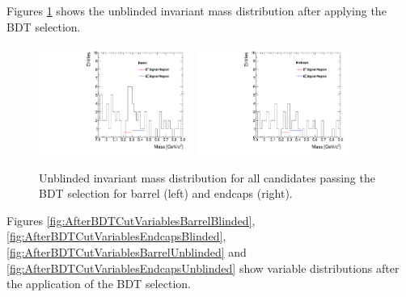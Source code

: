 Figures \ref{fig:massPlotUnblinded} shows the unblinded invariant mass distribution after applying the BDT selection.

\begin{figure}
  \centering
  \includegraphics[width=0.45\textwidth]{Figures/BarrelMassPlotUnblinded.pdf}
  \includegraphics[width=0.45\textwidth]{Figures/EndcapsMassPlotUnblinded.pdf}
  \caption{Unblinded invariant mass distribution for all candidates passing the BDT selection for barrel (left) and endcaps (right).}
  \label{fig:massPlotUnblinded}
\end{figure}


Figures \ref{fig:AfterBDTCutVariablesBarrelBlinded}, \ref{fig:AfterBDTCutVariablesEndcapsBlinded}, \ref{fig:AfterBDTCutVariablesBarrelUnblinded} and \ref{fig:AfterBDTCutVariablesEndcapsUnblinded} show variable distributions after the application of the BDT selection.

